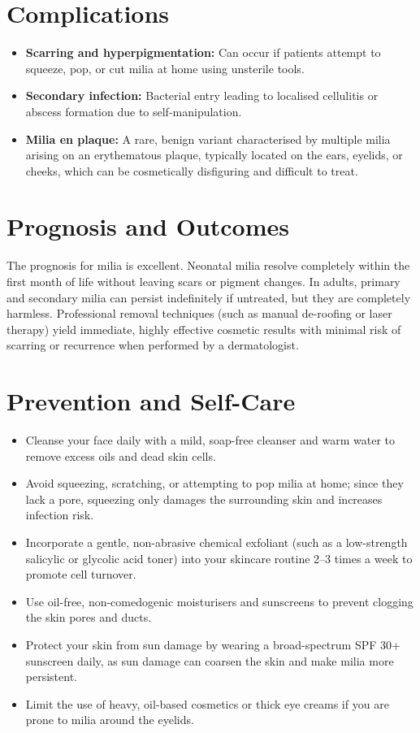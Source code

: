 \section*{Complications}
\begin{itemize}
    \item \textbf{Scarring and hyperpigmentation:} Can occur if patients attempt to squeeze, pop, or cut milia at home using unsterile tools.
    \item \textbf{Secondary infection:} Bacterial entry leading to localised cellulitis or abscess formation due to self-manipulation.
    \item \textbf{Milia en plaque:} A rare, benign variant characterised by multiple milia arising on an erythematous plaque, typically located on the ears, eyelids, or cheeks, which can be cosmetically disfiguring and difficult to treat.
\end{itemize}

\section*{Prognosis and Outcomes}
The prognosis for milia is excellent. Neonatal milia resolve completely within the first month of life without leaving scars or pigment changes. In adults, primary and secondary milia can persist indefinitely if untreated, but they are completely harmless. Professional removal techniques (such as manual de-roofing or laser therapy) yield immediate, highly effective cosmetic results with minimal risk of scarring or recurrence when performed by a dermatologist.

\section*{Prevention and Self-Care}
\begin{itemize}
    \item Cleanse your face daily with a mild, soap-free cleanser and warm water to remove excess oils and dead skin cells.
    \item Avoid squeezing, scratching, or attempting to pop milia at home; since they lack a pore, squeezing only damages the surrounding skin and increases infection risk.
    \item Incorporate a gentle, non-abrasive chemical exfoliant (such as a low-strength salicylic or glycolic acid toner) into your skincare routine 2--3 times a week to promote cell turnover.
    \item Use oil-free, non-comedogenic moisturisers and sunscreens to prevent clogging the skin pores and ducts.
    \item Protect your skin from sun damage by wearing a broad-spectrum SPF 30+ sunscreen daily, as sun damage can coarsen the skin and make milia more persistent.
    \item Limit the use of heavy, oil-based cosmetics or thick eye creams if you are prone to milia around the eyelids.
\end{itemize}

